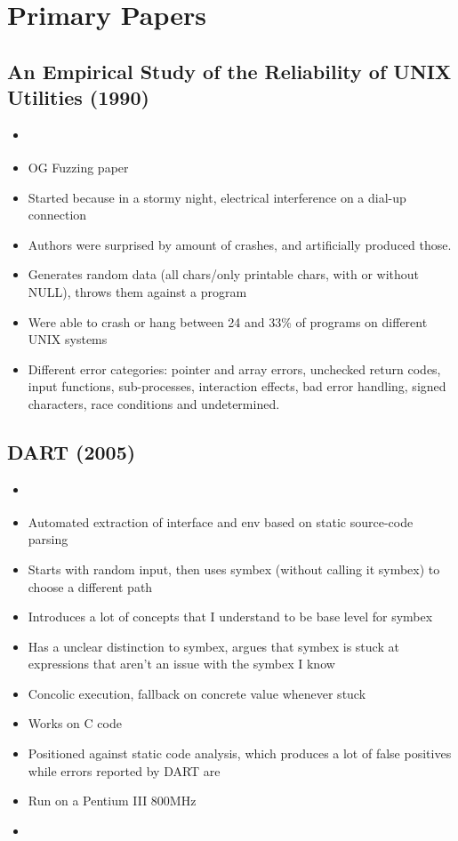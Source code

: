 \documentclass{article}
\begin{document}
\pagebreak
\section{Primary Papers}
\subsection{An Empirical Study of the Reliability of UNIX Utilities (1990)}
\begin{itemize}
  \item \cite{UNIX}
  \item OG Fuzzing paper
  \item Started because in a stormy night, electrical interference on a dial-up connection
  \item Authors were surprised by amount of crashes, and artificially produced those.
  \item Generates random data (all chars/only printable chars, with or without NULL), throws them against a program
  \item Were able to crash or hang between 24 and 33\% of programs on different UNIX systems
  \item Different error categories: pointer and array errors, unchecked return codes, input functions, sub-processes, interaction effects, bad error handling, signed characters, race conditions and undetermined.
\end{itemize}

\subsection{DART (2005)}
\begin{itemize}
  \item \cite{DART}
  \item Automated extraction of interface and env based on static source-code parsing
  \item Starts with random input, then uses symbex (without calling it symbex) to choose a different path
  \item Introduces a lot of concepts that I understand to be base level for symbex
  \item Has a unclear distinction to symbex, argues that symbex is stuck at expressions that aren't an issue with the symbex I know
  \item Concolic execution, fallback on concrete value whenever stuck
  \item Works on C code
  \item Positioned against static code analysis, which produces a lot of false positives while errors reported by DART are \cite{DART}
  \item Run on a Pentium III 800MHz
  \item {}\cite{DART}
\end{itemize}
\end{document}
